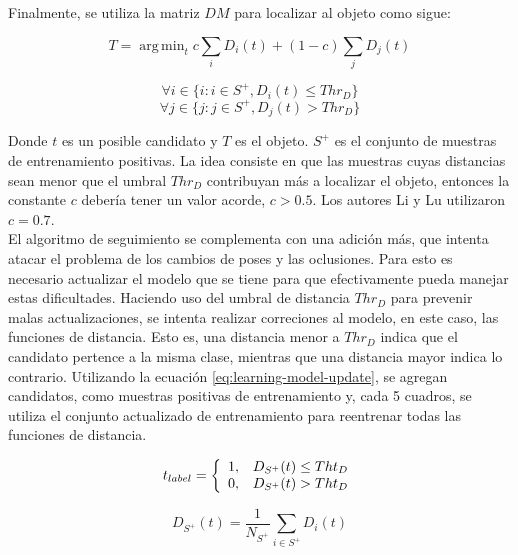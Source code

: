 \documentclass[a4paper,10pt]{article}
\DeclareMathOperator*{\argmin}{arg\,min}
\begin{document}
Finalmente, se utiliza la matriz $DM$ para localizar al objeto como sigue:

\begin{equation}
    T = \argmin_{t} c \sum_{i} D_{i}(t) + (1 - c) \sum_{j} D_{j}(t)
\end{equation}

\begin{equation}
    \forall i \in \{i : i \in S^{+}, D_{i}(t) \leq Thr_{D} \}
\end{equation}
\begin{equation}
    \forall j \in \{j : j \in S^{+}, D_{j}(t) > Thr_{D} \}
\end{equation}

Donde $t$ es un posible candidato y $T$ es el objeto. $S^{+}$ es el 
conjunto de muestras de entrenamiento positivas. La idea consiste en 
que las muestras cuyas distancias sean menor que el umbral $Thr_{D}$
contribuyan más a localizar el objeto, entonces la constante $c$ 
debería tener un valor acorde, $c > 0.5$. Los autores Li y Lu utilizaron $c = 0.7$\cite{local-learning}.\\

El algoritmo de seguimiento se complementa con una adición más, que 
intenta atacar el problema de los cambios de poses y las oclusiones.
Para esto es necesario actualizar el modelo que se tiene para 
que efectivamente pueda manejar estas dificultades. 
Haciendo uso del umbral de distancia $Thr_{D}$ para prevenir
malas actualizaciones, se intenta realizar correciones al modelo,
en este caso, las funciones de distancia. Esto es, una distancia
menor a $Thr_{D}$ indica que el candidato pertence a la misma clase,
mientras que una distancia mayor indica lo contrario. Utilizando 
la ecuación \ref{eq:learning-model-update}, se agregan candidatos,
como muestras positivas de entrenamiento y, cada 5 cuadros, 
se utiliza el conjunto actualizado de entrenamiento para 
reentrenar todas las funciones de distancia.

\begin{equation}
    \label{eq:learning-model-update}
    t_{label} = \left\{ 
                \begin{array}{l l}
                    1, & D_{S^{+}}(t) \leq Tht_{D}\\
                    0, & D_{S^{+}}(t) >  Tht_{D}
                \end{array} \right.
\end{equation}

\begin{equation}
    D_{S^{+}}(t) = \dfrac{1}{N_{S^{+}}} \sum_{i \in S^{+}} D_{i}(t)
\end{equation}
\end{document}
